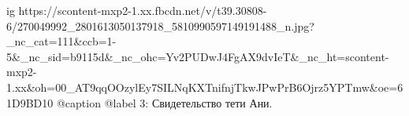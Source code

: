  
 
 
 
 

\ifcmt
  ig https://scontent-mxp2-1.xx.fbcdn.net/v/t39.30808-6/270049992_2801613050137918_5810990597149191488_n.jpg?_nc_cat=111&ccb=1-5&_nc_sid=b9115d&_nc_ohc=Yv2PUDwJ4FgAX9dvIeT&_nc_ht=scontent-mxp2-1.xx&oh=00_AT9qqOOzylEy7SILNqKXTnifnjTkwJPwPrB6Ojrz5YPTmw&oe=61D9BD10
	@caption @label 3: Свидетельство тети Ани.
\fi
